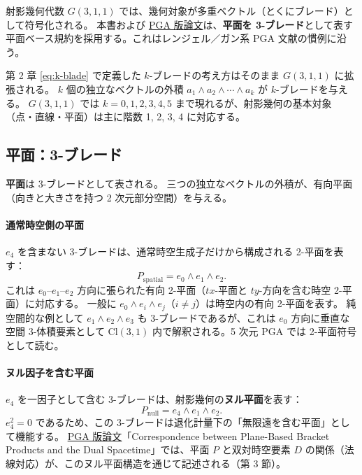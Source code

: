\documentclass[dvipdfmx,a4paper,oneside]{jsbook}
\numberwithin{equation}{chapter}
\begin{document}
射影幾何代数 \(G(3,1,1)\) では、幾何対象が多重ベクトル（とくにブレード）として符号化される。
本書および \hyperref[sec:sister-manuscripts]{PGA 版論文}は、\textbf{平面を 3-ブレード}として表す平面ベース規約を採用する。これはレンジェル／ガン系 PGA 文献の慣例に沿う。

第 2 章 \eqref{eq:k-blade} で定義した \(k\)-ブレードの考え方はそのまま \(G(3,1,1)\) に拡張される。
\(k\) 個の独立なベクトルの外積 \(a_1 \wedge a_2 \wedge \cdots \wedge a_k\) が \(k\)-ブレードを与える。
\(G(3,1,1)\) では \(k = 0,1,2,3,4,5\) まで現れるが、射影幾何の基本対象（点・直線・平面）は主に階数 1, 2, 3, 4 に対応する。

\subsection{平面：3-ブレード}

\textbf{平面}は 3-ブレードとして表される。
三つの独立なベクトルの外積が、有向平面（向きと大きさを持つ 2 次元部分空間）を与える。

\paragraph{通常時空側の平面}
\(e_4\) を含まない 3-ブレードは、通常時空生成子だけから構成される 2-平面を表す：
\begin{equation}
  P_{\mathrm{spatial}} = e_0 \wedge e_1 \wedge e_2.
  \label{eq:plane-spatial}
\end{equation}
これは \(e_0\)–\(e_1\)–\(e_2\) 方向に張られた有向 2-平面（\(tx\)-平面と \(ty\)-方向を含む時空 2-平面）に対応する。
一般に \(e_0 \wedge e_i \wedge e_j\)（\(i \neq j\)）は時空内の有向 2-平面を表す。
純空間的な例として \(e_1 \wedge e_2 \wedge e_3\) も 3-ブレードであるが、これは \(e_0\) 方向に垂直な空間 3-体積要素として \(\mathrm{Cl}(3,1)\) 内で解釈される。5 次元 PGA では 2-平面符号として読む。

\paragraph{ヌル因子を含む平面}
\(e_4\) を一因子として含む 3-ブレードは、射影幾何の\textbf{ヌル平面}を表す：
\begin{equation}
  P_{\mathrm{null}} = e_4 \wedge e_1 \wedge e_2.
  \label{eq:plane-null}
\end{equation}
\(e_4^2 = 0\) であるため、この 3-ブレードは退化計量下の「無限遠を含む平面」として機能する。
\hyperref[sec:sister-manuscripts]{PGA 版論文}「Correspondence between Plane-Based Bracket Products and the Dual Spacetime」では、平面 \(P\) と双対時空要素 \(D\) の関係（法線対応）が、このヌル平面構造を通じて記述される（第 3 節）。
\end{document}
